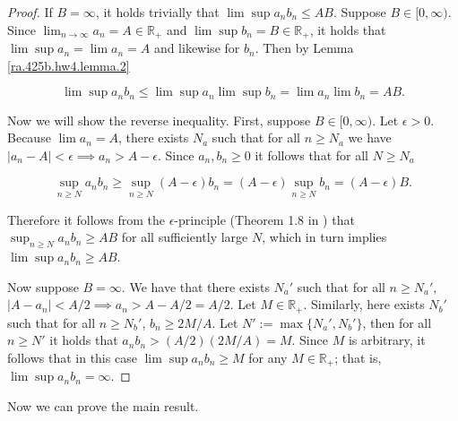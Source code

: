 \begin{proof}

If \(B = \infty\), it holds trivially that \(\lim \sup a_n b_n \leq AB\). Suppose \(B \in [0, \infty)\). Since \(\lim_{n \to \infty} a_n = A \in \mathbb{R}_+\) and \(\lim \sup b_n = B \in \mathbb{R}_+\), it holds that \(\lim \sup a_n = \lim a_n = A\) and likewise for \(b_n\). Then by Lemma \ref{ra.425b.hw4.lemma.2}

\[
 \lim \sup a_n b_n  \leq \lim \sup a_n \lim \sup b_n = \lim a_n \lim b_n = AB.
\]

Now we will show the reverse inequality. First, suppose \(B \in [0,\infty)\). Let \(\epsilon > 0\). Because \(\lim a_n = A\), there exists \(N_a\) such that for all \(n \geq N_a\) we have \(|a_n - A| < \epsilon \implies a_n > A - \epsilon\). Since \(a_n, b_n \geq 0\) it follows that for all \(N \geq N_a\)

\[
 \sup_{n \geq N} a_n b_n \geq  \sup_{n \geq N} (A - \epsilon) b_n =  (A - \epsilon) \sup_{n \geq N}  b_n = (A - \epsilon) B.
 \]
 
 Therefore it follows from the \(\epsilon\)-principle (Theorem 1.8 in \citet{pugh2015real}) that \( \sup_{n \geq N} a_n b_n  \geq AB\) for all sufficiently large \(N\), which in turn implies \( \lim \sup a_n b_n  \geq AB\).
 
 Now suppose \(B = \infty\). We have that there exists \(N_a'\) such that for all \(n \geq N_a'\), \(|A - a_n| < A/2 \implies a_n > A - A/2 = A/2\). Let \(M \in \mathbb{R}_+\). Similarly, here exists \(N_b'\) such that for all \(n \geq N_b'\), \(b_n \geq 2M/A\). Let \(N' := \max\{N_a', N_b'\}\), then for all \(n \geq N'\) it holds that \(a_n b_n > (A/2)(2M/A) = M\). Since \(M\) is arbitrary, it follows that in this case \( \lim \sup a_n b_n  \geq M\) for any \(M \in \mathbb{R}_+\); that is, \( \lim \sup a_n b_n  = \infty\).

%
%

\end{proof}

Now we can prove the main result.

